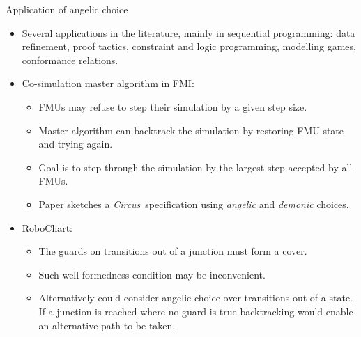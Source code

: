 \documentclass[%
    slidestop,%
    compress,%
    mathserif,%
    table,%
    usenames,%
    aspectratio=169,
    dvipsnames,%
]{beamer}%
\def\Circus{{\sf\slshape Circus}}
\begin{document}
\begin{frame}{Application of angelic choice}
    \begin{itemize}
        \pause \item Several applications in the literature, mainly in sequential programming: data refinement, proof tactics, constraint and logic programming, modelling games, conformance relations.
        \pause \item Co-simulation master algorithm in FMI: 
            \begin{itemize}
                \pause \item FMUs may refuse to step their simulation by a given step size.
                \pause \item Master algorithm can backtrack the simulation by restoring FMU state and trying again.
                \pause \item Goal is to step through the simulation by the largest step accepted by all FMUs.
                \pause \item Paper sketches a \Circus~specification using \emph{angelic} and \emph{demonic} choices.
            \end{itemize}
        \pause \item RoboChart:
            \begin{itemize}
                \pause \item The guards on transitions out of a junction must form a cover.
                \pause \item Such well-formedness condition may be inconvenient.
                \pause \item Alternatively could consider angelic choice over transitions out of a state. If a junction is reached where no guard is true backtracking would enable an alternative path to be taken.
            \end{itemize}
    \end{itemize}
\end{frame}
\end{document}
